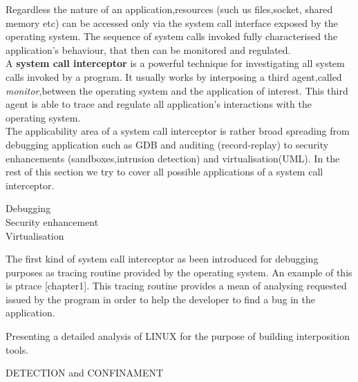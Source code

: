 

Regardless the nature of an application,resources (such us files,socket, shared memory etc) can be accessed only via the system call interface exposed by the operating system.
The sequence of system calls invoked fully characterised the application's behaviour, that then can be monitored and regulated. \\

A \textbf{system call interceptor} is a powerful technique for investigating all system calls invoked by a program. It usually works by interposing a third agent,called \textit{monitor},between the operating system and the application of interest. This third agent is able to trace and regulate all application's interactions with the operating system.\\


The applicability area of a system call interceptor is rather broad spreading from debugging application such as GDB and auditing (record-replay) to security enhancements (sandboxes,intrusion detection) and virtualisation(UML). In the rest of this section we try to cover all possible applications of a system call interceptor.  

\begin{description}
\item[Debugging] 
\item[Security enhancement]
\item[Virtualisation] 

\end{description}
The first kind of system call interceptor as been introduced for debugging purposes  as tracing routine provided by the operating system. An example of this is ptrace [chapter1]. This tracing routine provides a mean of analysing requested issued by the program in order to help the developer to find a bug in the application. 


Presenting a  detailed analysis of LINUX for the purpose of building interposition tools. 

DETECTION and CONFINAMENT 

